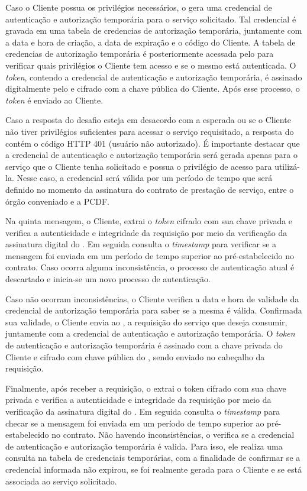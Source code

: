 Caso o Cliente possua os privilégios necessários, o \servidorAA{} gera uma credencial de autenticação e autorização temporária para o serviço solicitado. Tal credencial é gravada em uma tabela de credencias de autorização temporária, juntamente com a data e hora de criação, a data de expiração e o código do Cliente. A tabela de credencias de autorização temporária é posteriormente acessada pelo \servidorRest{} para verificar quais privilégios o Cliente tem acesso e se o mesmo está autenticada. O \emph{token}, contendo a credencial de autenticação e autorização temporária, é  assinado digitalmente pelo \servidorAA{} e cifrado  com a chave pública do Cliente. Após esse processo, o \emph{token} é enviado ao Cliente.

Caso a resposta do desafio esteja em desacordo com a esperada ou se o Cliente não tiver privilégios suficientes para acessar o serviço requisitado, a resposta do \servidorAA{} contém o código HTTP 401 (usuário não autorizado).
É importante destacar que a credencial de autenticação e autorização temporária será gerada apenas para o serviço que o Cliente tenha solicitado e possua o privilégio de acesso para utilizá-la. Nesse caso, a credencial será válida por um período  de tempo que será definido no momento da assinatura do contrato de prestação de serviço,
entre o órgão conveniado e a PCDF.

Na quinta mensagem, o Cliente, extrai o \emph{token} cifrado com sua chave privada e verifica a autenticidade e integridade da requisição por meio da verificação da assinatura digital do \servidorAA. Em seguida consulta
o \emph{timestamp} para verificar se a mensagem foi enviada em um período de tempo superior ao pré-estabelecido no contrato. Caso ocorra alguma inconsistência, o processo de autenticação atual é descartado e inicia-se um novo processo de autenticação.

Caso não ocorram inconsistências, o Cliente verifica a data e hora de validade da credencial de autorização temporária para saber se a mesma é válida. Confirmada sua validade, o Cliente envia ao \servidorRest, a requisição do serviço que deseja consumir, juntamente com a credencial de autenticação e autorização temporária. O \emph{token} de autenticação e autorização temporária é assinado com a chave privada do Cliente e cifrado com chave pública do \servidorRest, sendo enviado no cabeçalho da requisição.

Finalmente, após receber a requisição, o \servidorRest{} extrai o token cifrado com sua chave privada e verifica a autenticidade e integridade da requisição por meio da verificação da assinatura digital do \servidorAA. Em seguida consulta o \emph{timestamp} para checar se a mensagem foi enviada em um período de tempo superior ao pré-estabelecido no contrato. Não havendo inconsistências, o \servidorRest{}verifica se a credencial de autenticação e autorização temporária é valida. Para isso, ele realiza uma consulta na tabela de credenciais temporárias, com a finalidade de confirmar se a credencial informada não expirou, se  foi realmente gerada para o Cliente e se está associada ao serviço solicitado.

